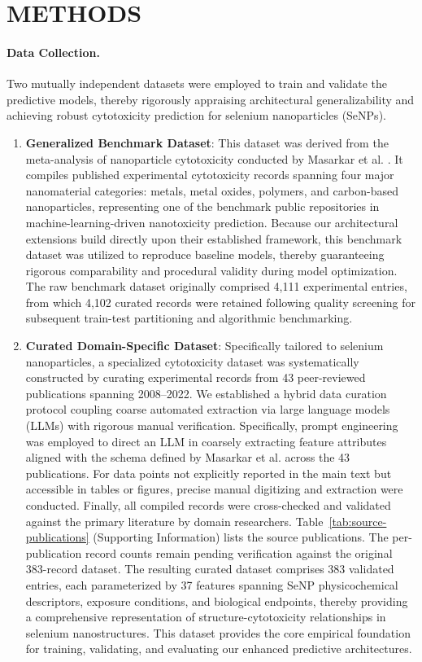 \section{METHODS}

\paragraph{Data Collection.}
Two mutually independent datasets were employed to train and validate the predictive models, thereby rigorously appraising architectural generalizability and achieving robust cytotoxicity prediction for selenium nanoparticles (SeNPs).

\begin{enumerate}
  \item \textbf{Generalized Benchmark Dataset}: This dataset was derived from the meta-analysis of nanoparticle cytotoxicity conducted by Masarkar et al. \cite{masarkar2024}. It compiles published experimental cytotoxicity records spanning four major nanomaterial categories: metals, metal oxides, polymers, and carbon-based nanoparticles, representing one of the benchmark public repositories in machine-learning-driven nanotoxicity prediction. Because our architectural extensions build directly upon their established framework, this benchmark dataset was utilized to reproduce baseline models, thereby guaranteeing rigorous comparability and procedural validity during model optimization. The raw benchmark dataset originally comprised 4,111 experimental entries, from which 4,102 curated records were retained following quality screening for subsequent train-test partitioning and algorithmic benchmarking.

  \item \textbf{Curated Domain-Specific Dataset}: Specifically tailored to selenium nanoparticles, a specialized cytotoxicity dataset was systematically constructed by curating experimental records from 43 peer-reviewed publications spanning 2008–2022. We established a hybrid data curation protocol coupling coarse automated extraction via large language models (LLMs) with rigorous manual verification. Specifically, prompt engineering was employed to direct an LLM in coarsely extracting feature attributes aligned with the schema defined by Masarkar et al. \cite{masarkar2024} across the 43 publications. For data points not explicitly reported in the main text but accessible in tables or figures, precise manual digitizing and extraction were conducted. Finally, all compiled records were cross-checked and validated against the primary literature by domain researchers. Table~\ref{tab:source-publications} (Supporting Information) lists the source publications. The per-publication record counts remain pending verification against the original 383-record dataset. The resulting curated dataset comprises 383 validated entries, each parameterized by 37 features spanning SeNP physicochemical descriptors, exposure conditions, and biological endpoints, thereby providing a comprehensive representation of structure-cytotoxicity relationships in selenium nanostructures. This dataset provides the core empirical foundation for training, validating, and evaluating our enhanced predictive architectures.
\end{enumerate}

